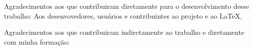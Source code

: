 \begin{agradecimentos}
Agradecimentos aos que contribuiram diretamente para o desenvolvimento desse trabalho:
Aos desenvovedores, usuários e contribuintes ao projeto \abnTeX e ao \LaTeX ,

Agradecimentos aos que contribuiram indiretamente ao trabalho 
e diretamente com minha formação:

\end{agradecimentos}
